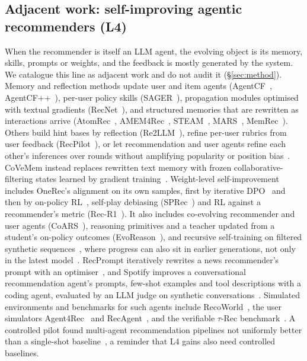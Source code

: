 \documentclass[sigconf,nonacm]{acmart}
\begin{document}
\subsection{Adjacent work: self-improving agentic recommenders (L4)}\label{sec:l4}
When the recommender is itself an LLM agent, the evolving object is its memory, skills, prompts or weights, and the
feedback is mostly generated by the system. We catalogue this line as adjacent work and do not audit it
(\S\ref{sec:method}). Memory and reflection methods update user and item agents
(AgentCF~\cite{zhang2024agentcf}, AgentCF++~\cite{liu2025agentcfpp}), per-user policy
skills (SAGER~\cite{tao2026sager}), propagation modules optimised with textual gradients (RecNet~\cite{li2026recnet}),
and structured memories that are rewritten as interactions arrive (AtomRec~\cite{hu2026atomrec},
AMEM4Rec~\cite{nguyen2026amem4rec}, STEAM~\cite{liao2026steam}, MARS~\cite{shen2026mars}, MemRec~\cite{chen2026memrec}). Others build hint bases by reflection (Re2LLM~\cite{wang2024re2llm}), refine per-user
rubrics from user feedback (RecPilot~\cite{ou2026recpilot}), or let recommendation and user agents refine
each other's inferences over rounds without amplifying popularity or position bias~\cite{cai2024afl}. CoVeMem instead replaces rewritten text memory
with frozen collaborative-filtering states learned by gradient training~\cite{chen2026covemem}.
Weight-level self-improvement includes OneRec's alignment on its own samples, first by iterative
DPO~\cite{deng2025onerec} and then by on-policy RL~\cite{zhou2025onerectech,zhou2025openonerec}, self-play debiasing (SPRec~\cite{gao2024sprec}) and RL against a recommender's metric
(Rec-R1~\cite{lin2025recr1}). It also includes co-evolving recommender and user agents (CoARS~\cite{wang2026coars}), reasoning primitives and a teacher updated from a
student's on-policy outcomes (EvoReason~\cite{zhuang2026evoreason}), and recursive
self-training on filtered synthetic sequences~\cite{zhang2026rsir,hasan2026darsir}, where progress can also sit in earlier
generations, not only in the latest model~\cite{xu2026stateretention}. RecPrompt iteratively rewrites a news recommender's prompt with an
optimiser~\cite{liu2023recprompt}, and Spotify improves a conversational
recommendation agent's prompts, few-shot examples and tool descriptions with a coding agent, evaluated by an LLM judge
on synthetic conversations~\cite{palumbo2026spotify}. Simulated environments and benchmarks for such agents include
RecoWorld~\cite{liu2025recoworld}, the user simulators Agent4Rec~\cite{zhang2023agent4rec} and
RecAgent~\cite{wang2023recagent}, and the verifiable $\tau$-Rec benchmark~\cite{narasimhan2026taurec}. A controlled pilot found multi-agent recommendation
pipelines not uniformly better than a single-shot baseline~\cite{maragheh2025future}, a reminder that L4 gains also need
controlled baselines.
\end{document}
